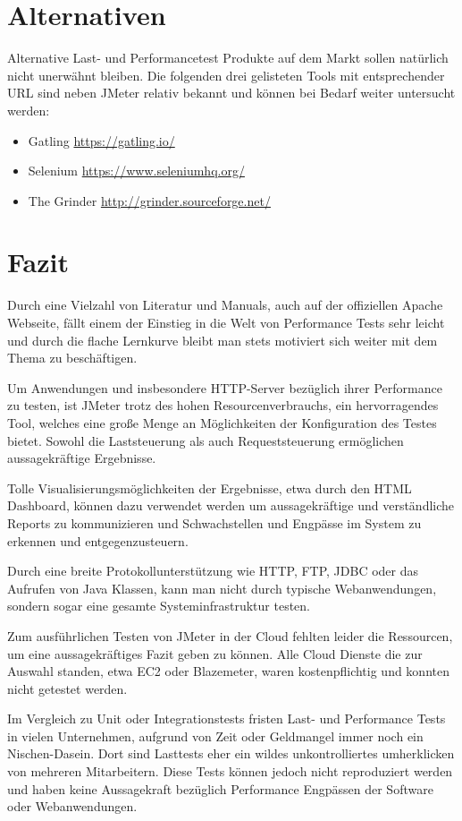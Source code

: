 \documentclass[a4paper,12pt]{article}
\begin{document}
\section{Alternativen}
Alternative  Last- und Performancetest Produkte auf dem Markt sollen natürlich nicht unerwähnt bleiben. Die folgenden drei gelisteten Tools mit entsprechender URL sind neben JMeter relativ bekannt und können bei Bedarf weiter untersucht werden: 
\begin{itemize}
	\item Gatling \url{https://gatling.io/}
	\item Selenium \url{https://www.seleniumhq.org/}
	\item The Grinder \url{http://grinder.sourceforge.net/}
\end{itemize}

\section{Fazit}
Durch eine Vielzahl von Literatur und Manuals, auch auf der offiziellen Apache Webseite, fällt einem der Einstieg in die Welt von Performance Tests sehr leicht und durch die flache Lernkurve bleibt man stets motiviert sich weiter mit dem Thema zu beschäftigen.

Um Anwendungen und insbesondere HTTP-Server bezüglich ihrer Performance zu testen, ist JMeter trotz des hohen Resourcenverbrauchs, ein hervorragendes Tool, welches eine große Menge an Möglichkeiten der Konfiguration des Testes bietet. Sowohl die Laststeuerung als auch Requeststeuerung ermöglichen aussagekräftige Ergebnisse.

Tolle Visualisierungsmöglichkeiten der Ergebnisse, etwa durch den HTML Dashboard, können dazu verwendet werden um aussagekräftige und verständliche Reports zu kommunizieren und Schwachstellen und Engpässe im System zu erkennen und entgegenzusteuern.

Durch eine breite Protokollunterstützung wie HTTP, FTP, JDBC oder das Aufrufen von Java Klassen, kann man nicht durch typische Webanwendungen, sondern sogar eine gesamte Systeminfrastruktur testen.

Zum ausführlichen Testen von JMeter in der Cloud fehlten leider die Ressourcen, um eine aussagekräftiges Fazit geben zu können. Alle Cloud Dienste die zur Auswahl standen, etwa EC2 oder Blazemeter, waren kostenpflichtig und konnten nicht getestet werden.

Im Vergleich zu Unit oder Integrationstests fristen Last- und Performance Tests in vielen Unternehmen, aufgrund von Zeit oder Geldmangel immer noch ein Nischen-Dasein. Dort sind Lasttests eher ein wildes unkontrolliertes umherklicken von mehreren Mitarbeitern. Diese Tests können jedoch nicht reproduziert werden und haben keine Aussagekraft bezüglich Performance Engpässen der Software oder Webanwendungen. 
\end{document}
